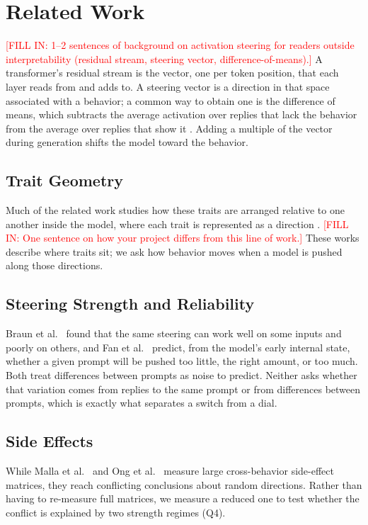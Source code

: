 \documentclass[11pt]{article}
\newcommand{\fillin}[1]{\textcolor{red}{[FILL IN: #1]}}
\newcommand{\upd}[1]{{\color{updgreen}#1}}
\begin{document}
\section{Related Work}

\fillin{1--2 sentences of background on activation steering for readers outside
interpretability (residual stream, steering vector, difference-of-means).}
\upd{A transformer's residual stream is the vector, one per token position, that
each layer reads from and adds to. A steering vector is a direction in that space
associated with a behavior; a common way to obtain one is the difference of
means, which subtracts the average activation over replies that lack the behavior
from the average over replies that show it \cite{chen2025persona}. Adding a
multiple of the vector during generation shifts the model toward the behavior.}

\subsection{Trait Geometry}
Much of the related work studies how these traits are arranged relative to one another
inside the model, where each trait is represented as a direction
\cite{lu2026assistant,xu2026manifold,abootorabi2026geometry}.
\fillin{One sentence on how your project differs from this line of work.}
\upd{These works describe where traits sit; we ask how behavior moves when a model
is pushed along those directions.}

\subsection{Steering Strength and Reliability}
Braun et al.\ \cite{braun2025unreliability} found that the same steering can work well
on some inputs and poorly on others, and Fan et al.\ \cite{fan2026steerable} predict,
from the model's early internal state, whether a given prompt will be pushed too
little, the right amount, or too much. Both treat differences between prompts as noise
to predict. Neither asks whether that variation comes from replies to the same prompt
or from differences between prompts, which is exactly what separates a switch from a
dial.

\subsection{Side Effects}
While Malla et al.\ \cite{malla2026interference} and Ong et al.\
\cite{ong2026forecasting} measure large cross-behavior side-effect matrices, they reach
conflicting conclusions about random directions. Rather than having to re-measure full
matrices, we measure a reduced one to test whether the conflict is explained by two
strength regimes (Q4).
\end{document}
